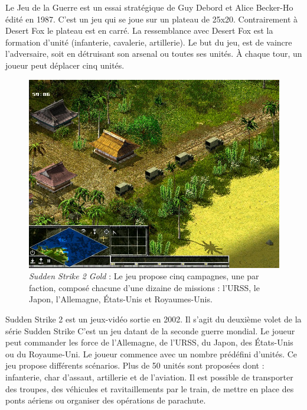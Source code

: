 Le Jeu de la Guerre \cite{frwiki:189457170} est un essai stratégique de Guy Debord et Alice Becker-Ho édité en 1987.
C'est un jeu qui se joue sur un plateau de 25x20. Contrairement à Desert Fox le plateau est en carré. La ressemblance avec Desert Fox est la formation d'unité (infanterie, cavalerie, artillerie).
Le but du jeu, est de vaincre l'adversaire, soit en détruisant son arsenal ou toutes ses unités. À chaque tour, un joueur peut déplacer cinq unités.


\begin{figure}[H]
    \centering
    \includegraphics[scale=0.3]{data/sudden_strike_2.jpg}
    \caption{\textit{Sudden Strike 2 Gold} : Le jeu propose cinq campagnes, une par faction, composé chacune d’une dizaine de missions : l'URSS, le Japon, l'Allemagne, États-Unis et Royaumes-Unis.}
\end{figure}

Sudden Strike 2 est un jeux-vidéo sortie en 2002. Il s'agit du deuxième volet de la série Sudden Strike C'est un jeu datant de la seconde guerre mondial. Le joueur peut commander les force de l’Allemagne, de l’URSS, du Japon, des États-Unis ou du Royaume-Uni.
Le joueur commence avec un nombre prédéfini d'unités. Ce jeu propose différents scénarios. Plus de 50 unités sont proposées dont : infanterie, char d'assaut, artillerie et de l'aviation. Il est possible de transporter des troupes, des véhicules et ravitaillements par le train, de mettre en place des ponts aériens ou organiser des opérations de parachute.


